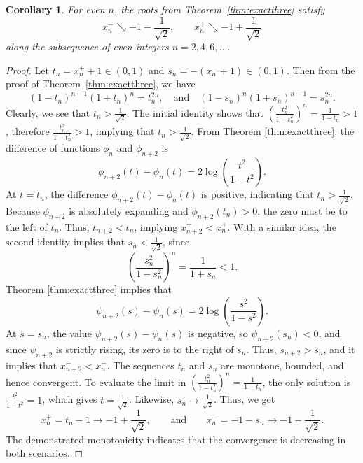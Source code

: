 \documentclass[10pt,a4paper]{amsart}
\newtheorem{corollary}{Corollary}
\begin{document}
	\begin{corollary}
		\label{cor:monotone}
		For even $n$, the roots from Theorem~\ref{thm:exactthree} satisfy
		$$
		x_n^- \searrow -1-\frac{1}{\sqrt2},
		\qquad
		x_n^+ \searrow -1+\frac{1}{\sqrt2}
		$$
		along the subsequence of even integers $n=2,4,6,\dots$.
	\end{corollary}

	\begin{proof}
		Let $t_n=x_n^++1\in(0,1)$ and $s_n=-(x_n^-+1)\in(0,1)$. Then from the proof of Theorem~\ref{thm:exactthree}, we have
		$$
		(1-t_n)^{n-1}(1+t_n)^n=t_n^{2n},\quad \text{and} \quad 	(1-s_n)^n(1+s_n)^{n-1}=s_n^{2n}.
		$$
		 Clearly, we see that $t_n>\tfrac{1}{\sqrt{2}}$. The initial identity shows that \(\left(\frac{t_n^2}{1-t_n^2}\right)^n=\frac{1}{1-t_n}>1 \), therefore \(\frac{t_n^2}{1-t_n^2}>1 \), implying that \(t_n>\frac{1}{\sqrt{2}} \).  From Theorem \ref{thm:exactthree}, the difference of functions $\phi_n$ and $\phi_{n+2}$ is
		 \begin{equation*}
		 	\phi_{n+2}(t)-\phi_n(t)=2\log\left(\frac{t^2}{1-t^2}\right).
		 \end{equation*}
		 At \(t=t_n \), the difference \(\phi_{n+2}(t)-\phi_n(t) \) is positive, indicating that \(t_n > \frac{1}{\sqrt{2}} \). Because $\phi_{n+2}$ is absolutely expanding and $\phi_{n+2}(t_n) > 0$, the zero must be to the left of $t_n$. Thus, $t_{n+2} < t_n$, implying $x_{n+2}^+ < x_n^+$.
		With a similar idea, the second identity implies that $s_n<\tfrac{1}{\sqrt2}$, since
		$$
		\left(\frac{s_n^2}{1-s_n^2}\right)^n=\frac{1}{1+s_n}<1.
		$$
		Theorem \ref{thm:exactthree} implies that
		$$
		\psi_{n+2}(s)-\psi_n(s)=2\log\left(\frac{s^2}{1-s^2}\right).
		$$
		At $s=s_n$, the value $\psi_{n+2}(s)-\psi_n(s)$ is negative,  so $\psi_{n+2}(s_n)<0$, and since $\psi_{n+2}$ is strictly rising, its zero is to the right of $s_n$. Thus, $s_{n+2}>s_n$, and it implies that $x_{n+2}^-<x_n^-$. The sequences ${t_n}$ and ${s_n}$ are monotone, bounded, and hence convergent. To evaluate the limit in $\left(\frac{t_n^2}{1-t_n^2}\right)^n=\frac{1}{1-t_n}$, the only solution is $\tfrac{t^2}{1-t^2}=1$, which gives $t=\tfrac{1}{\sqrt2}$.
		 Likewise, $s_n\to \tfrac{1}{\sqrt2}$. Thus, we get
		$$
		x_n^+=t_n-1 \to -1+\frac{1}{\sqrt2},
		\qquad\text{and} \qquad
		x_n^-=-1-s_n \to -1-\frac{1}{\sqrt2}.
		$$
		The demonstrated monotonicity indicates that the convergence is decreasing in both scenarios.
	\end{proof}
\end{document}
